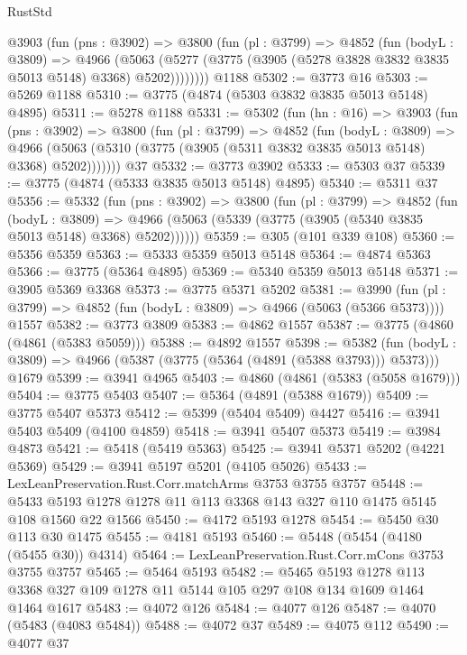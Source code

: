 \begin{lexlean}{RustStd}
\begin{coremodule}
{\begin{coremodule}
{{{{{{{{{{{{{{{{{{{{{{{{{{{{{{{      @3903
        (fun (pns : @3902) =>
        @3800
          (fun (pl : @3799) =>
          @4852
            (fun (bodyL : @3809) =>
            @4966
              (@5063 (@5277 (@3775 (@3905 (@5278 @3828 @3832 @3835 @5013 @5148) @3368) @5202))))))))
    @1188
@5302 := @3773 @16
@5303 := @5269 @1188
@5310 := @3775 (@4874 (@5303 @3832 @3835 @5013 @5148) @4895)
@5311 := @5278 @1188
@5331 := @5302
    (fun (hn : @16) =>
    @3903
      (fun (pns : @3902) =>
      @3800
        (fun (pl : @3799) =>
        @4852
          (fun (bodyL : @3809) =>
          @4966 (@5063 (@5310 (@3775 (@3905 (@5311 @3832 @3835 @5013 @5148) @3368) @5202)))))))
    @37
@5332 := @3773 @3902
@5333 := @5303 @37
@5339 := @3775 (@4874 (@5333 @3835 @5013 @5148) @4895)
@5340 := @5311 @37
@5356 := @5332
    (fun (pns : @3902) =>
    @3800
      (fun (pl : @3799) =>
      @4852
        (fun (bodyL : @3809) =>
        @4966 (@5063 (@5339 (@3775 (@3905 (@5340 @3835 @5013 @5148) @3368) @5202))))))
@5359 := @305 (@101 @339 @108)
@5360 := @5356 @5359
@5363 := @5333 @5359 @5013 @5148
@5364 := @4874 @5363
@5366 := @3775 (@5364 @4895)
@5369 := @5340 @5359 @5013 @5148
@5371 := @3905 @5369 @3368
@5373 := @3775 @5371 @5202
@5381 := @3990
    (fun (pl : @3799) => @4852 (fun (bodyL : @3809) => @4966 (@5063 (@5366 @5373))))
    @1557
@5382 := @3773 @3809
@5383 := @4862 @1557
@5387 := @3775 (@4860 (@4861 (@5383 @5059)))
@5388 := @4892 @1557
@5398 := @5382
    (fun (bodyL : @3809) => @4966 (@5387 (@3775 (@5364 (@4891 (@5388 @3793))) @5373)))
    @1679
@5399 := @3941 @4965
@5403 := @4860 (@4861 (@5383 (@5058 @1679)))
@5404 := @3775 @5403
@5407 := @5364 (@4891 (@5388 @1679))
@5409 := @3775 @5407 @5373
@5412 := @5399 (@5404 @5409) @4427
@5416 := @3941 @5403 @5409 (@4100 @4859)
@5418 := @3941 @5407 @5373
@5419 := @3984 @4873
@5421 := @5418 (@5419 @5363)
@5425 := @3941 @5371 @5202 (@4221 @5369)
@5429 := @3941 @5197 @5201 (@4105 @5026)
@5433 := LexLeanPreservation.Rust.Corr.matchArms @3753 @3755 @3757
@5448 := @5433 @5193 @1278 @1278 @11 @113 @3368 @143 @327 @110 @1475 @5145 @108 @1560 @22 @1566
@5450 := @4172 @5193 @1278
@5454 := @5450 @30 @113 @30 @1475
@5455 := @4181 @5193
@5460 := @5448 (@5454 (@4180 (@5455 @30)) @4314)
@5464 := LexLeanPreservation.Rust.Corr.mCons @3753 @3755 @3757
@5465 := @5464 @5193
@5482 := @5465
    @5193
    @1278
    @113
    @3368
    @327
    @109
    @1278
    @11
    @5144
    @105
    @297
    @108
    @134
    @1609
    @1464
    @1464
    @1617
@5483 := @4072 @126
@5484 := @4077 @126
@5487 := @4070 (@5483 (@4083 @5484))
@5488 := @4072 @37
@5489 := @4075 @112
@5490 := @4077 @37
}}}}}}}}}}}}}}}}}}}}}}}}}}}}}}}
\end{coremodule}}
\end{coremodule}
\end{lexlean}
